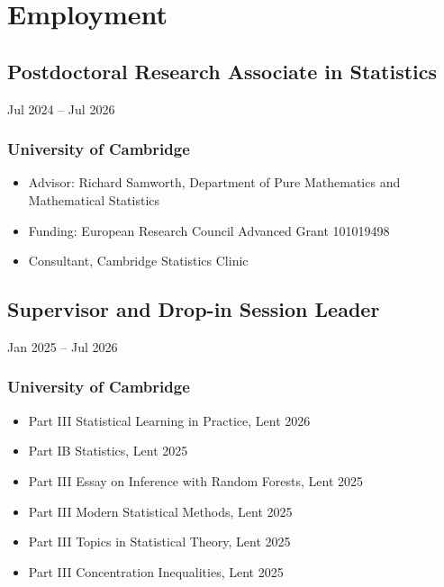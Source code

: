 \documentclass{wgu-cv}
\begin{document}
\maketitle

\section{Employment}

\subsection{Postdoctoral Research Associate in Statistics}
{Jul 2024 -- Jul 2026}
\subsubsection{University of Cambridge}

\begin{itemize}
  \item Advisor: Richard Samworth,
    Department of Pure Mathematics and Mathematical Statistics
  \item Funding: European Research Council Advanced Grant 101019498
  \item Consultant, Cambridge Statistics Clinic
\end{itemize}

\subsection{Supervisor and Drop-in Session Leader}
{Jan 2025 -- Jul 2026}
\subsubsection{University of Cambridge}

\begin{itemize}

  \item
    Part III Statistical Learning in Practice, Lent 2026

  \item
    Part IB Statistics, Lent 2025

  \item
    Part III Essay on Inference with Random Forests, Lent 2025

  \item
    Part III Modern Statistical Methods, Lent 2025

  \item
    Part III Topics in Statistical Theory, Lent 2025

  \item
    Part III Concentration Inequalities, Lent 2025

\end{itemize}
\end{document}
